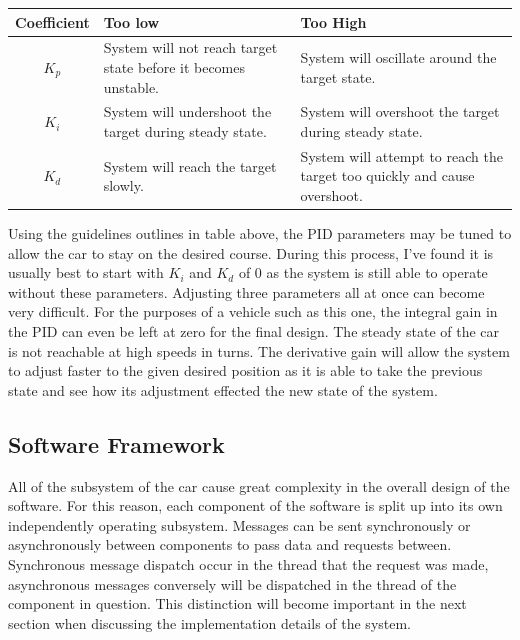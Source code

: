 \documentclass{article}
\begin{document}
\begin{table}[htb]
	\renewcommand{\arraystretch}{1.2}
	\begin{tabularx}{\columnwidth}{|c|>{\raggedright\arraybackslash}X|>{\raggedright\arraybackslash}X|}
		\hline
		Coefficient & Too low & Too High \\
		\hline
		$K_p$ & System will not reach target state before it becomes unstable. & System will oscillate around the target state. \\
		\hline
		$K_i$ & System will undershoot the target during steady state. & System will overshoot the target during steady state. \\
		\hline
		$K_d$ & System will reach the target slowly. & System will attempt to reach the target too quickly and cause overshoot. \\
		\hline
	\end{tabularx}
	\label{tab:pid}
\end{table}

Using the guidelines outlines in table above, the PID parameters may be tuned to
allow the car to stay on the desired course. During this process, I've found it
is usually best to start with $K_i$ and $K_d$ of $0$ as the system is still able
to operate without these parameters. Adjusting three parameters all at once can
become very difficult. For the purposes of a vehicle such as this one, the integral
gain in the PID can even be left at zero for the final design. The steady state of
the car is not reachable at high speeds in turns. The derivative gain will allow the
system to adjust faster to the given desired position as it is able to take the
previous state and see how its adjustment effected the new state of the system. 

\subsection{Software Framework}

All of the subsystem of the car cause great complexity in the overall design of
the software. For this reason, each component of the software is split up into
its own independently operating subsystem. Messages can be sent synchronously
or asynchronously between components to pass data and requests between. Synchronous
message dispatch occur in the thread that the request was made, asynchronous messages
conversely will be dispatched in the thread of the component in question. This
distinction will become important in the next section when discussing the
implementation details of the system.
\end{document}
